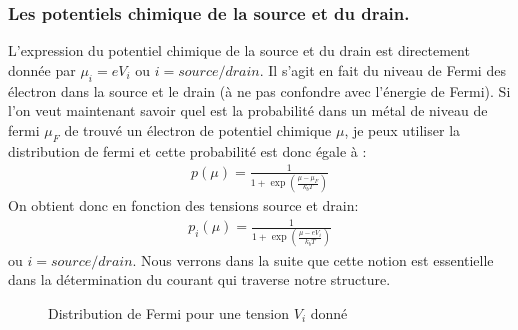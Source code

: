 \subsubsection{Les potentiels chimique de la source et du drain.}
L'expression du potentiel chimique de la source et du drain est directement donnée par $\mu_i = e V_i$ ou $i=source/drain$. Il s'agit en fait du niveau de Fermi des électron dans la source et le drain (à ne pas confondre avec l'énergie de Fermi). Si l'on veut maintenant savoir quel est la probabilité dans un métal de niveau de fermi $\mu_F$ de trouvé un électron de potentiel chimique $\mu$, je peux utiliser la distribution de fermi et cette probabilité est donc égale à :
\begin{eqnarray}
p(\mu) = \frac{1}{1 + \exp{(\frac{\mu - \mu_F}{k_bT})}} \nonumber
\end{eqnarray}
 On obtient donc en fonction des tensions source et drain:
\begin{eqnarray}
p_i(\mu) = \frac{1}{1 + \exp{(\frac{\mu - eV_i}{k_bT})}}
\end{eqnarray}
ou $i=source/drain$. Nous verrons dans la suite que cette notion est essentielle dans la détermination du courant qui traverse notre structure.

\begin{figure}
\caption{Distribution de Fermi pour une tension $V_i$ donné}
\label{distrib_fermi}
\end{figure}



